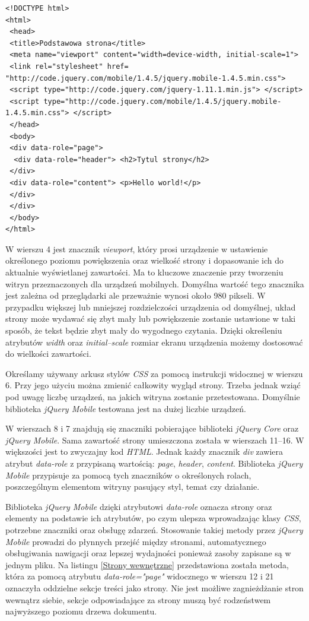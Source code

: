 \documentclass{iiuwb}
\begin{document}
\begin{lstlisting}[label=Strona jQueryMobile, caption=Prosta strona HTML5 dla aplikacji jQuery Mobile]
<!DOCTYPE html> 
<html>
 <head>
 <title>Podstawowa strona</title>
 <meta name="viewport" content="width=device-width, initial-scale=1">
 <link rel="stylesheet" href= "http://code.jquery.com/mobile/1.4.5/jquery.mobile-1.4.5.min.css">
 <script type="http://code.jquery.com/jquery-1.11.1.min.js"> </script>
 <script type="http://code.jquery.com/mobile/1.4.5/jquery.mobile-1.4.5.min.css"> </script>
 </head> 
 <body>
 <div data-role="page">
  <div data-role="header"> <h2>Tytul strony</h2>
 </div>
 <div data-role="content"> <p>Hello world!</p>
 </div> 
 </div>
 </body> 
</html>
\end{lstlisting}
W wierszu 4 jest znacznik \textit{viewport}, który prosi urządzenie w ustawienie określonego poziomu powiększenia oraz wielkość strony i dopasowanie ich do aktualnie wyświetlanej zawartości. Ma to kluczowe znaczenie przy tworzeniu witryn przeznaczonych dla urządzeń mobilnych. Domyślna wartość tego znacznika jest zależna od przeglądarki ale przeważnie wynosi około 980 pikseli. W przypadku większej lub mniejszej rozdzielczości urządzenia od domyślnej, układ strony może wydawać się zbyt mały lub powiększenie zostanie ustawione w taki sposób, że tekst będzie zbyt mały do wygodnego czytania. Dzięki określeniu atrybutów \textit{width} oraz \textit{initial--scale} rozmiar ekranu urządzenia możemy dostosować do wielkości zawartości. 

Określamy używany arkusz stylów \textit{CSS} za pomocą instrukcji widocznej w wierszu 6. Przy jego użyciu można zmienić całkowity wygląd strony. Trzeba jednak wziąć pod uwagę liczbę urządzeń, na jakich witryna zostanie przetestowana. Domyślnie biblioteka \textit{jQuery Mobile} testowana jest na dużej liczbie urządzeń.

W wierszach 8 i 7 znajdują się znaczniki pobierające biblioteki \textit{jQuery Core} oraz \textit{jQuery Mobile}. Sama zawartość strony umieszczona została  w wierszach 11--16. W większości jest to zwyczajny kod \textit{HTML}. Jednak każdy znacznik \textit{div} zawiera atrybut \textit{data-role} z przypisaną wartością: \textit{page}, \textit{header}, \textit{content}. Biblioteka \textit{jQuery Mobile} przypisuje za pomocą tych znaczników o określonych rolach, poszczególnym elementom witryny pasujący styl, temat czy działanie.

Biblioteka \textit{jQuery Mobile} dzięki atrybutowi \textit{data-role} oznacza strony oraz elementy na podstawie ich atrybutów, po czym ulepsza  wprowadzając klasy \textit{CSS}, potrzebne znaczniki oraz obsługę zdarzeń. Stosowanie takiej metody przez \textit{jQuery Mobile} prowadzi do płynnych przejść między stronami, automatycznego obsługiwania nawigacji oraz lepszej wydajności ponieważ zasoby zapisane są w jednym pliku. 
Na listingu \ref{Strony wewnętrzne} przedstawiona została metoda, która za pomocą atrybutu \textit{data-role="page"} widocznego w wierszu 12 i 21 oznaczyła oddzielne sekcje treści jako strony. Nie jest możliwe zagnieżdżanie stron wewnątrz siebie, sekcje odpowiadające za strony muszą być rodzeństwem najwyższego poziomu drzewa dokumentu.
\end{document}
